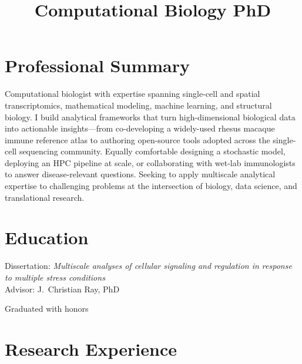 \documentclass[11pt, a4paper]{moderncv}
\title{Computational Biology PhD}
\begin{document}
\makecvtitle

\section{Professional Summary}
Computational biologist with expertise spanning single-cell and spatial transcriptomics,
mathematical modeling, machine learning, and structural biology. I build analytical
frameworks that turn high-dimensional biological data into actionable insights---from
co-developing a widely-used rhesus macaque immune reference atlas to authoring open-source
tools adopted across the single-cell sequencing community. Equally comfortable designing a
stochastic model, deploying an HPC pipeline at scale, or collaborating with wet-lab
immunologists to answer disease-relevant questions. Seeking to apply multiscale analytical
expertise to challenging problems at the intersection of biology, data science, and
translational research.

\section{Education}
%
  {Dissertation: \textit{Multiscale analyses of cellular signaling and regulation in response to multiple stress conditions}\\
   Advisor: J.\ Christian Ray, PhD}

%
  {Graduated with honors}

\section{Research Experience}
\end{document}
